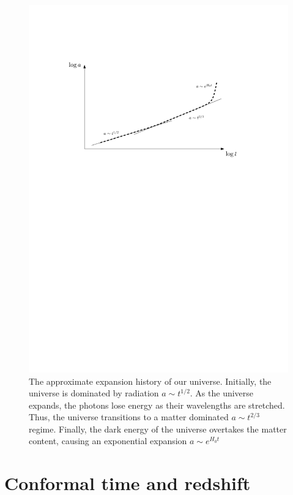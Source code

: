 \begin{figure}[tp]
  \centering
  \includegraphics[width=\textwidth]{chapters/inflationary_cosmology/figures/expansion_history}
  \caption{The approximate expansion history of our universe. Initially, the universe is dominated by radiation $a\sim t^{1/2}$. As the universe expands, the photons lose energy as their wavelengths are stretched.  Thus, the universe transitions to a matter dominated $a\sim t^{2/3}$ regime. Finally, the dark energy of the universe overtakes the matter content, causing an exponential expansion $a\sim e^{H_0 t}$\label{fig:cos:expansion_history}}
\end{figure}


\section{Conformal time and redshift}
